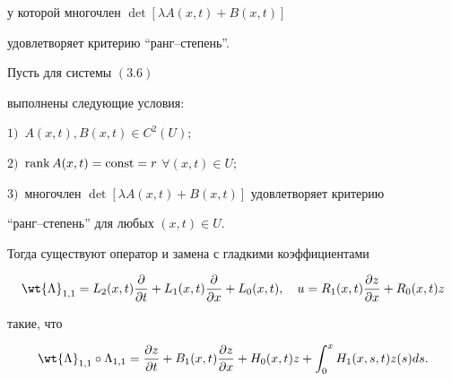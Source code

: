 у которой многочлен $\det [\lambda A(x,t)+B(x,t)]$


удовлетворяет критерию ``ранг--степень''.





\begin{thms}


Пусть для системы $(3.6)$


выполнены следующие условия\/${:}$


$1)$~$A(x,t), B(x,t)\in C^{2}(U);$


$2)$~$\operatorname{rank} A(x,t)=\operatorname{const}=r$\; $\forall (x,t)\in U;$


$3)$~многочлен $\det[\lambda A(x,t)+B(x,t)]$ удовлетворяет критерию


``ранг--степень'' для любых $(x,t)\in U$.





Тогда существуют оператор и замена с гладкими коэффициентами


$$


\wt {\Lambda }_{1,1}=L_{2}(x,t)\frac{\partial }{\partial t}+


L_{1}(x,t)\frac{\partial }{\partial x}+L_{0}(x,t),\quad


u=R_1(x,t)\frac{\partial z}{\partial x}+R_0(x,t)z


$$


такие, что


$$


\wt {\Lambda }_{1,1}\circ \Lambda _{1,1}=


\frac{\partial z}{\partial t}+


B_{1}(x,t)\frac{\partial z}{\partial x}+H_{0}(x,t)z+


\int _0^xH_1(x,s,t)z(s)ds.


$$


\end{thms}





